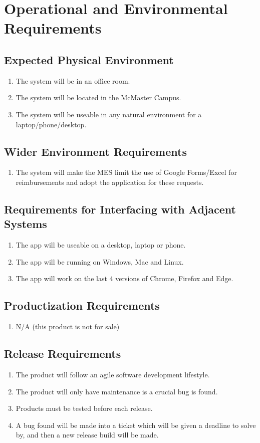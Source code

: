 \documentclass[12pt]{article}
\begin{document}
\section{Operational and Environmental Requirements}
\subsection{Expected Physical Environment}
\begin{enumerate}
  \item The system will be in an office room.
  \item The system will be located in the McMaster Campus. 
  \item The system will be useable in any natural environment for a laptop/phone/desktop. 
\end{enumerate}
\subsection{Wider Environment Requirements}
\begin{enumerate}
  \item The system will make the MES limit the use of Google Forms/Excel for reimbursements and adopt the application for these requests.
\end{enumerate}

\subsection{Requirements for Interfacing with Adjacent Systems}
\begin{enumerate}
  \item The app will be useable on a desktop, laptop or phone.
  \item The app will be running on Windows, Mac and Linux. 
  \item The app will work on the last 4 versions of Chrome, Firefox and Edge. 
\end{enumerate}
\subsection{Productization Requirements}
\begin{enumerate}
  \item N/A (this product is not for sale) 
\end{enumerate}
\subsection{Release Requirements}
\begin{enumerate}
  \item The product will follow an agile software development lifestyle.
  \item The product will only have maintenance is a crucial bug is found. 
  \item Products must be tested before each release. 
  \item A bug found will be made into a ticket which will be given a deadline to solve by, and then a new release build will be made.  
\end{enumerate}
\end{document}
